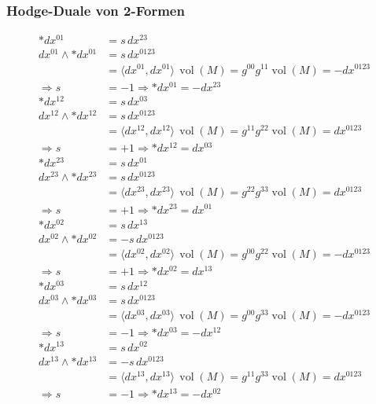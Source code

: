 \subsubsection{Hodge-Duale von 2-Formen}
\begin{align*}
	\ast dx^{01} &= s \, dx^{23} \\
	dx^{01} \wedge \ast dx^{01} &= s \, dx^{0123} \\
	&= \langle dx^{01}, dx^{01} \rangle \, \operatorname{vol}(M) 
	= g^{00} g^{11} \operatorname{vol}(M) = -dx^{0123} \\
	\Rightarrow s &= -1 \Rightarrow \boxed{\ast dx^{01} = - dx^{23}}
	\\[1em]
	\ast dx^{12} &= s \, dx^{03} \\
	dx^{12} \wedge \ast dx^{12} &= s \, dx^{0123} \\
	&= \langle dx^{12}, dx^{12} \rangle \, \operatorname{vol}(M) 
	= g^{11} g^{22} \operatorname{vol}(M) = dx^{0123} \\
	\Rightarrow s &= +1 \Rightarrow \boxed{\ast dx^{12} = dx^{03}}
	\\[1em]
	\ast dx^{23} &= s \, dx^{01} \\
	dx^{23} \wedge \ast dx^{23} &= s \, dx^{0123} \\
	&= \langle dx^{23}, dx^{23} \rangle \, \operatorname{vol}(M) 
	= g^{22} g^{33} \operatorname{vol}(M) = dx^{0123} \\
	\Rightarrow s &= +1 \Rightarrow \boxed{\ast dx^{23} = dx^{01}}
	\\[1em]
	\ast dx^{02} &= s \, dx^{13} \\
	dx^{02} \wedge \ast dx^{02} &= -s \, dx^{0123} \\
	&= \langle dx^{02}, dx^{02} \rangle \, \operatorname{vol}(M) 
	= g^{00} g^{22} \operatorname{vol}(M) = -dx^{0123} \\
	\Rightarrow s &= +1 \Rightarrow \boxed{\ast dx^{02} = dx^{13}}
	\\[1em]
	\ast dx^{03} &= s \, dx^{12} \\
	dx^{03} \wedge \ast dx^{03} &= s \, dx^{0123} \\
	&= \langle dx^{03}, dx^{03} \rangle \, \operatorname{vol}(M) 
	= g^{00} g^{33} \operatorname{vol}(M) = -dx^{0123} \\
	\Rightarrow s &= -1 \Rightarrow \boxed{\ast dx^{03} = - dx^{12}}
	\\[1em]
	\ast dx^{13} &= s \, dx^{02} \\
	dx^{13} \wedge \ast dx^{13} &= -s \, dx^{0123} \\
	&= \langle dx^{13}, dx^{13} \rangle \, \operatorname{vol}(M) 
	= g^{11} g^{33} \operatorname{vol}(M) = dx^{0123} \\
	\Rightarrow s &= -1 \Rightarrow \boxed{\ast dx^{13} = - dx^{02}}
\end{align*}
